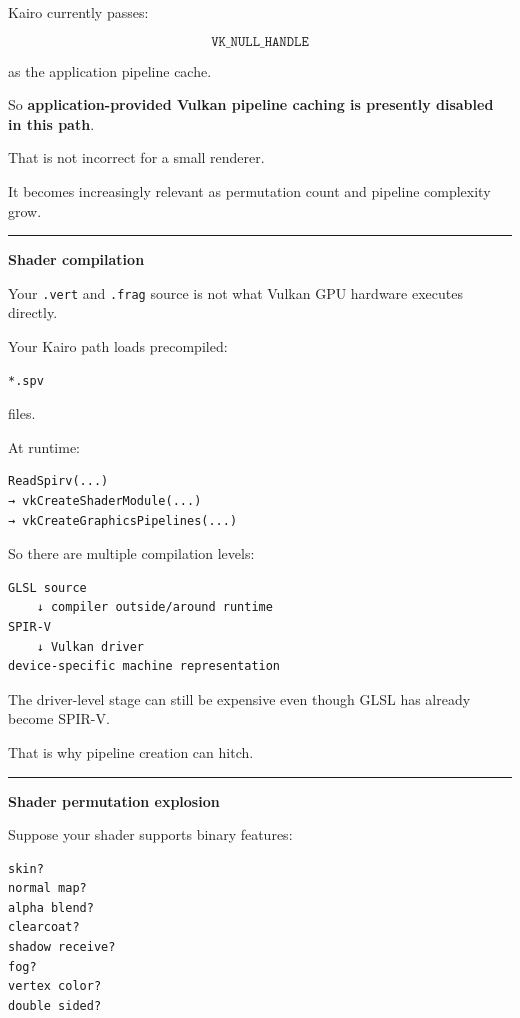 Kairo currently passes:

\[
\boxed{\texttt{VK\_NULL\_HANDLE}}
\]

as the application pipeline cache.

So \textbf{application-provided Vulkan pipeline caching is presently disabled in this path}.

That is not incorrect for a small renderer.

It becomes increasingly relevant as permutation count and pipeline complexity grow.

\begin{center}\rule{0.5\linewidth}{0.5pt}\end{center}

\textbf{Shader compilation}

Your \texttt{.vert} and \texttt{.frag} source is not what Vulkan GPU hardware executes directly.

Your Kairo path loads precompiled:

\begin{verbatim}
*.spv
\end{verbatim}

files.

At runtime:

\begin{verbatim}
ReadSpirv(...)
→ vkCreateShaderModule(...)
→ vkCreateGraphicsPipelines(...)
\end{verbatim}

So there are multiple compilation levels:

\begin{verbatim}
GLSL source
    ↓ compiler outside/around runtime
SPIR-V
    ↓ Vulkan driver
device-specific machine representation
\end{verbatim}

The driver-level stage can still be expensive even though GLSL has already become SPIR-V.

That is why pipeline creation can hitch.

\begin{center}\rule{0.5\linewidth}{0.5pt}\end{center}

\textbf{Shader permutation explosion}

Suppose your shader supports binary features:

\begin{verbatim}
skin?
normal map?
alpha blend?
clearcoat?
shadow receive?
fog?
vertex color?
double sided?
\end{verbatim}

